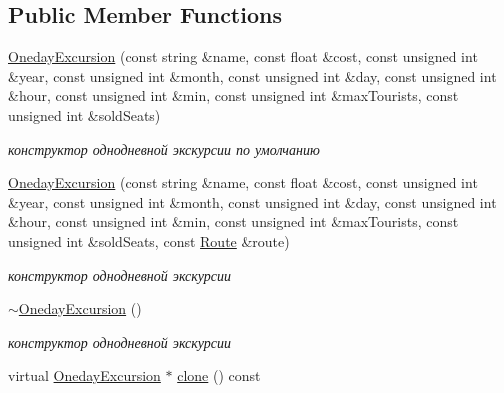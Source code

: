 \subsection*{Public Member Functions}
\begin{DoxyCompactItemize}
\item 
\hypertarget{class_oneday_excursion_a1ac2c8f44be8ad9294a0c601d4ec3f21}{}\hyperlink{class_oneday_excursion_a1ac2c8f44be8ad9294a0c601d4ec3f21}{Oneday\+Excursion} (const string \&name, const float \&cost, const unsigned int \&year, const unsigned int \&month, const unsigned int \&day, const unsigned int \&hour, const unsigned int \&min, const unsigned int \&max\+Tourists, const unsigned int \&sold\+Seats)\label{class_oneday_excursion_a1ac2c8f44be8ad9294a0c601d4ec3f21}

\begin{DoxyCompactList}\small\item\em конструктор однодневной экскурсии по умолчанию \end{DoxyCompactList}\item 
\hypertarget{class_oneday_excursion_af0a903573c4e4470fddd3183c2eae30e}{}\hyperlink{class_oneday_excursion_af0a903573c4e4470fddd3183c2eae30e}{Oneday\+Excursion} (const string \&name, const float \&cost, const unsigned int \&year, const unsigned int \&month, const unsigned int \&day, const unsigned int \&hour, const unsigned int \&min, const unsigned int \&max\+Tourists, const unsigned int \&sold\+Seats, const \hyperlink{class_route}{Route} \&route)\label{class_oneday_excursion_af0a903573c4e4470fddd3183c2eae30e}

\begin{DoxyCompactList}\small\item\em конструктор однодневной экскурсии \end{DoxyCompactList}\item 
\hypertarget{class_oneday_excursion_a086bfa348889e493e3a1e32d504f442e}{}\hyperlink{class_oneday_excursion_a086bfa348889e493e3a1e32d504f442e}{$\sim$\+Oneday\+Excursion} ()\label{class_oneday_excursion_a086bfa348889e493e3a1e32d504f442e}

\begin{DoxyCompactList}\small\item\em конструктор однодневной экскурсии \end{DoxyCompactList}\item 
\hypertarget{class_oneday_excursion_ac30696f6a7a717f0252001e8454f7341}{}virtual \hyperlink{class_oneday_excursion}{Oneday\+Excursion} $\ast$ \hyperlink{class_oneday_excursion_ac30696f6a7a717f0252001e8454f7341}{clone} () const \label{class_oneday_excursion_ac30696f6a7a717f0252001e8454f7341}


\end{DoxyCompactItemize}
